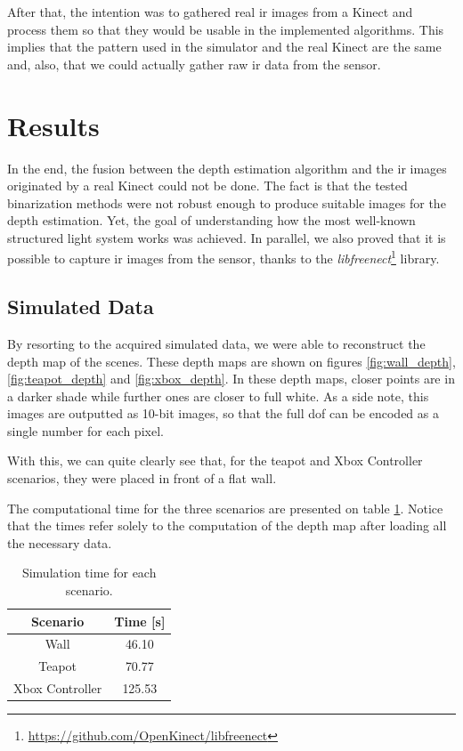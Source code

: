 \documentclass[journal]{IEEEtran}
\begin{document}
After that, the intention was to gathered real \gls{ir} images from a Kinect and process them so that they would be usable in the implemented algorithms. This implies that the pattern used in the simulator and the real Kinect are the same and, also, that we could actually gather raw \gls{ir} data from the sensor.

\section{Results}

In the end, the fusion between the depth estimation algorithm and the \gls{ir} images originated by a real Kinect could not be done. The fact is that the tested binarization methods were not robust enough to produce suitable images for the depth estimation. Yet, the goal of understanding how the most well-known structured light system works was achieved. In parallel, we also proved that it is possible to capture \gls{ir} images from the sensor, thanks to the \textit{libfreenect}\footnote{\url{https://github.com/OpenKinect/libfreenect}} library.

\subsection{Simulated Data}

By resorting to the acquired simulated data, we were able to reconstruct the depth map of the scenes. These depth maps are shown on figures \ref{fig:wall_depth}, \ref{fig:teapot_depth} and \ref{fig:xbox_depth}. In these depth maps, closer points are in a darker shade while further ones are closer to full white. As a side note, this images are outputted as 10-bit images, so that the full \gls{dof} can be encoded as a single number for each pixel.

With this, we can quite clearly see that, for the teapot and Xbox Controller scenarios, they were placed in front of a flat wall. 

The computational time for the three scenarios are presented on table \ref{tbl:sim_time}. Notice that the times refer solely to the computation of the depth map after loading all the necessary data.

\begin{table}[!t]
\renewcommand{\arraystretch}{1.3}
    \caption{Simulation time for each scenario.}
    \label{tbl:sim_time}
    \centering
    \begin{tabular}{|c||c|}
        \hline
        \textbf{Scenario} & \textbf{Time {[}s{]}} \\
        \hline
        Wall & 46.10 \\
        \hline
        Teapot & 70.77 \\
        \hline
        Xbox Controller & 125.53 \\
        \hline
    \end{tabular}
\end{table}
\end{document}
